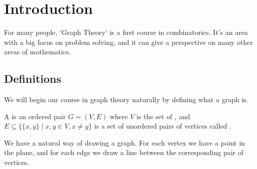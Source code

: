 \documentclass[a4paper]{scrreprt}
\begin{document}


\chapter{Introduction}

For many people, `Graph Theory' is a first course in combinatorics. It's an area with a big focus on problem solving, and it can give a perspective on many other areas of mathematics.  

\section{Definitions}

We will begin our course in graph theory naturally by defining what a graph is.

\begin{definition}[Graph]
	A  is an ordered pair $G = (V, E)$ where $V$ is the set of , and $E \subseteq \{ \{x,y\} \mid x, y \in V, x \neq y \}$ is a set of unordered pairs of vertices called .
\end{definition}

We have a natural way of drawing a graph. For each vertex we have a point in the plane, and for each edge we draw a line between the corresponding pair of vertices.
\end{document}
